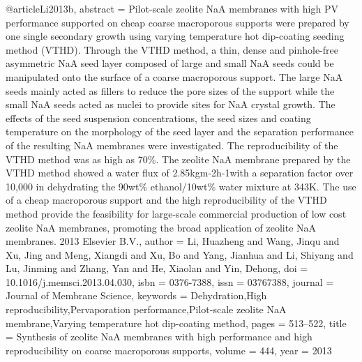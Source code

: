 @article{Li2013b,
abstract = {Pilot-scale zeolite NaA membranes with high PV performance supported on cheap coarse macroporous supports were prepared by one single secondary growth using varying temperature hot dip-coating seeding method (VTHD). Through the VTHD method, a thin, dense and pinhole-free asymmetric NaA seed layer composed of large and small NaA seeds could be manipulated onto the surface of a coarse macroporous support. The large NaA seeds mainly acted as fillers to reduce the pore sizes of the support while the small NaA seeds acted as nuclei to provide sites for NaA crystal growth. The effects of the seed suspension concentrations, the seed sizes and coating temperature on the morphology of the seed layer and the separation performance of the resulting NaA membranes were investigated. The reproducibility of the VTHD method was as high as 70{\%}. The zeolite NaA membrane prepared by the VTHD method showed a water flux of 2.85kgm-2h-1with a separation factor over 10,000 in dehydrating the 90wt{\%} ethanol/10wt{\%} water mixture at 343K. The use of a cheap macroporous support and the high reproducibility of the VTHD method provide the feasibility for large-scale commercial production of low cost zeolite NaA membranes, promoting the broad application of zeolite NaA membranes. {\textcopyright} 2013 Elsevier B.V.},
author = {Li, Huazheng and Wang, Jinqu and Xu, Jing and Meng, Xiangdi and Xu, Bo and Yang, Jianhua and Li, Shiyang and Lu, Jinming and Zhang, Yan and He, Xiaolan and Yin, Dehong},
doi = {10.1016/j.memsci.2013.04.030},
isbn = {0376-7388},
issn = {03767388},
journal = {Journal of Membrane Science},
keywords = {Dehydration,High reproducibility,Pervaporation performance,Pilot-scale zeolite NaA membrane,Varying temperature hot dip-coating method},
pages = {513--522},
title = {{Synthesis of zeolite NaA membranes with high performance and high reproducibility on coarse macroporous supports}},
volume = {444},
year = {2013}
}
